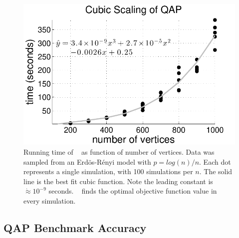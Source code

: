 \documentclass[preprint,11pt]{elsarticle}
\begin{document}
\begin{figure}[htbp]
	\centering			
	\includegraphics[width=0.7\linewidth]{ErdosRenyi_results.pdf}
	\caption{Running time of \FAQ~ as function of number of vertices. Data was sampled from an Erd\"os-R\'enyi model with $p=log(n)/n$.  Each dot represents a single simulation, with 100 simulations per $n$.  The solid line is the best fit cubic function.  Note the leading constant is $\dot{\approx} 10^{-9}$ seconds. \FAQ~ finds the optimal objective function value in every simulation.}
	\label{fig:scaling}
\end{figure}


\subsection{QAP Benchmark Accuracy} %
\label{sub:qap_benchmarks}
\end{document}
